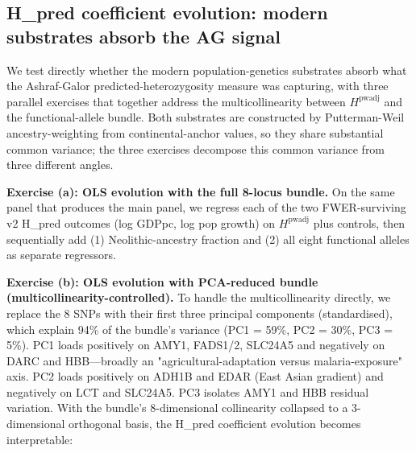 \documentclass[11pt,letterpaper]{article}
\begin{document}
\subsection{H\_pred coefficient evolution: modern substrates absorb the AG signal}
\label{sec:h-pred-evolution}

We test directly whether the modern population-genetics substrates absorb what the Ashraf-Galor predicted-heterozygosity measure was capturing, with three parallel exercises that together address the multicollinearity between $H^{\text{pwadj}}$ and the functional-allele bundle. Both substrates are constructed by Putterman-Weil ancestry-weighting from continental-anchor values, so they share substantial common variance; the three exercises decompose this common variance from three different angles.

\textbf{Exercise (a): OLS evolution with the full 8-locus bundle.}
On the same panel that produces the main panel, we regress each of the two FWER-surviving v2 H\_pred outcomes (log GDPpc, log pop growth) on $H^{\text{pwadj}}$ plus controls, then sequentially add (1) Neolithic-ancestry fraction and (2) all eight functional alleles as separate regressors.

\begin{table}[H]
\centering
\small
\caption{H\_pred coefficient evolution with full 8-SNP bundle (Exercise a). R\textsuperscript{2} rises substantially with the functional bundle, but the H\_pred coefficient becomes unstable: the standard error inflates and the sign flips on log GDPpc, characteristic of multicollinearity between H\_pred and the bundle. This is the predicted consequence of two PW-ancestry-weighted measures spanning overlapping continental gradients, not an empirical anomaly.}
\label{tab:h-pred-evolution}

\end{table}

\textbf{Exercise (b): OLS evolution with PCA-reduced bundle (multicollinearity-controlled).}
To handle the multicollinearity directly, we replace the 8 SNPs with their first three principal components (standardised), which explain 94\% of the bundle's variance (PC1 = 59\%, PC2 = 30\%, PC3 = 5\%). PC1 loads positively on AMY1, FADS1/2, SLC24A5 and negatively on DARC and HBB—broadly an "agricultural-adaptation versus malaria-exposure" axis. PC2 loads positively on ADH1B and EDAR (East Asian gradient) and negatively on LCT and SLC24A5. PC3 isolates AMY1 and HBB residual variation. With the bundle's 8-dimensional collinearity collapsed to a 3-dimensional orthogonal basis, the H\_pred coefficient evolution becomes interpretable:
\end{document}
